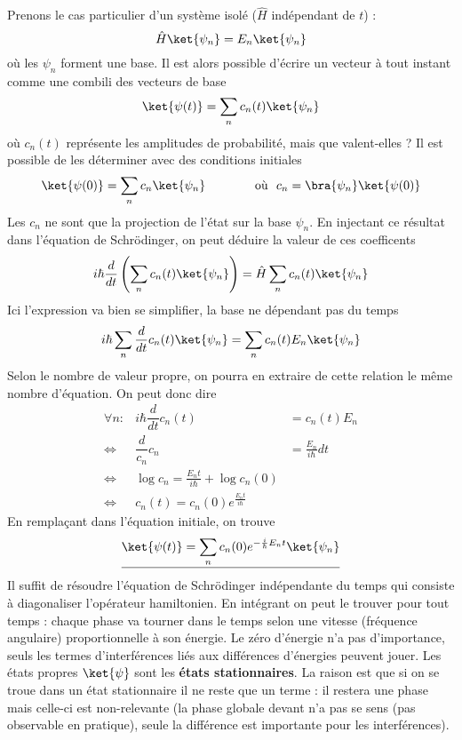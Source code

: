 Prenons le cas particulier d'un système isolé ($\hat{H}$ indépendant de $t$) :
\begin{equation}
\hat{H}\ket{\psi_n} = E_n\ket{\psi_n}
\end{equation}
où les $\psi_n$ forment une base. Il est alors possible d'écrire un vecteur à tout 
instant comme une combili des vecteurs de base
\begin{equation}
\ket{\psi(t)} = \sum_n c_n(t)\ket{\psi_n}
\end{equation}
où $c_n(t)$ représente les amplitudes de probabilité, mais que valent-elles ? Il est 
possible de les déterminer avec des conditions initiales
\begin{equation}
\ket{\psi(0)} = \sum_n c_n\ket{\psi_n}\qquad\qquad \text{où }\ c_n = \bra{\psi_n}\ket{\psi(0)}
\end{equation}
Les $c_n$ ne sont que la projection de l'état sur la base $\psi_n$. En injectant ce 
résultat dans l'équation de Schrödinger, on peut déduire la valeur de ces coefficents
\begin{equation}
i\hbar\dfrac{d}{dt}\left(\sum_n c_n(t)\ket{\psi_n}\right) = \hat{H}\sum_n c_n(t)\ket{\psi_n}
\end{equation}
Ici l'expression va bien se simplifier, la base ne dépendant pas du temps
\begin{equation}
i\hbar \sum_n \dfrac{d}{dt}c_n(t)\ket{\psi_n} = \sum_n c_n(t)E_n\ket{\psi_n}
\end{equation}
Selon le nombre de valeur propre, on pourra en extraire de cette relation le même nombre 
d'équation. On peut donc dire
\begin{equation}
\begin{array}{lll}
\forall n: &i\hbar \dfrac{d}{dt}c_n(t) &= c_n(t)E_n\\
 \Leftrightarrow & \dfrac{d}{c_n}c_n &= \frac{E_n}{i\hbar}dt\\
 \Leftrightarrow & \log c_n = \frac{E_nt}{i\hbar} + \log c_n(0)\\
 \Leftrightarrow & c_n(t) = c_n(0)e^{\frac{E_nt}{i\hbar}}
\end{array}
\end{equation}
En remplaçant dans l'équation initiale, on trouve
\begin{equation}
\underline{\ket{\psi(t)} = \sum_n c_n(0)e^{-\frac{i}{\hbar}E_nt}\ket{\psi_n}}
\end{equation}
Il suffit de résoudre l'équation de Schrödinger indépendante du temps qui consiste 
à diagonaliser l'opérateur hamiltonien. En intégrant on peut le trouver pour tout 
temps : chaque phase va tourner dans le temps selon une vitesse (fréquence angulaire) 
proportionnelle à son énergie. Le zéro d'énergie n'a pas d'importance, seuls les termes 
d'interférences liés aux différences d'énergies peuvent jouer. Les états propres $\ket{\psi}$ 
sont les \textbf{états stationnaires}. La raison est que si on se troue dans un état stationnaire il 
ne reste que un terme : il restera une phase mais celle-ci est non-relevante 
(la phase globale devant n'a pas se sens (pas observable en pratique), seule la différence est 
importante pour les interférences).\\

